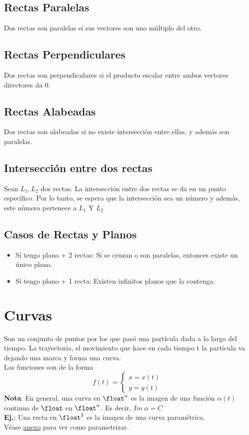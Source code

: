 \documentclass[10pt,a4paper]{article}
\begin{document}
\subsection*{Rectas Paralelas}
Dos rectas son paralelas sí sus vectores son uno múltiplo del otro.
\subsection*{Rectas Perpendiculares}
Dos rectas son perpendiculares si el producto escalar entre ambos vectores directores da 0.
\subsection*{Rectas Alabeadas}
Dos rectas son alabeadas si no existe intersección entre ellas, y además son paralelas.
\subsection*{Intersección entre dos rectas}
Sean $L_{1}, L_{2}$ dos rectas.
La intersección entre dos rectas se da en un punto específico. Por lo tanto, se espera que la intersección sea un número y además, este número pertenece a $L_{1}$ Y $L_{2}$
\subsection*{Casos de Rectas y Planos}
\begin{itemize}
    \item Si tengo plano + 2 rectas: Si se cruzan o son paralelas, entonces existe un único plano.
    \item Si tengo plano + 1 recta: Existen infinitos planos que la contenga.
\end{itemize}
\section*{Curvas}
Son un conjunto de puntos por los que pasó una partícula dada a lo largo del tiempo.
La trayectoria, el movimiento que hace en cada tiempo t la partícula va dejando una marca y forma una curva. \\
Las funciones son de la forma 
\[
f(t) =
\begin{cases} 
x = x(t) \\
y = y(t)
\end{cases}
\]
\textbf{Nota}: En general, una curva en $\float^{n}$ es la imagen de una función $ \alpha(t)$ continua de $\float$ en $\float^{n}$. Es decir, $Im \ \alpha = C$ \\
\textbf{Ej.}: Una recta en $\float^{2}$ es la imagen de una curva paramétrica. \\
Véase \hyperref[subsec:curvas_ejemplo]{anexo} para ver como parametrizar.
\end{document}
